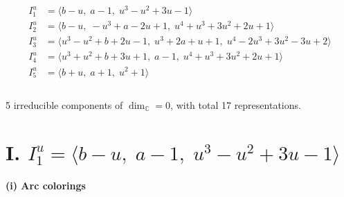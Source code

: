 \documentclass[1p]{elsarticle_modified}
\theoremstyle{definition}
\begin{document}
\begin{align*}
I^u_{1}&=\langle 
b- u,\;a-1,\;u^3- u^2+3 u-1\rangle \\
I^u_{2}&=\langle 
b- u,\;- u^3+a-2 u+1,\;u^4+u^3+3 u^2+2 u+1\rangle \\
I^u_{3}&=\langle 
u^3- u^2+b+2 u-1,\;u^3+2 a+u+1,\;u^4-2 u^3+3 u^2-3 u+2\rangle \\
I^u_{4}&=\langle 
u^3+u^2+b+3 u+1,\;a-1,\;u^4+u^3+3 u^2+2 u+1\rangle \\
I^u_{5}&=\langle 
b+u,\;a+1,\;u^2+1\rangle \\
\\
\end{align*}
\raggedright * 5 irreducible components of $\dim_{\mathbb{C}}=0$, with total 17 representations.\\
\newpage
\renewcommand{\arraystretch}{1}
\centering \section*{I. $I^u_{1}= \langle b- u,\;a-1,\;u^3- u^2+3 u-1 \rangle$}
\flushleft \textbf{(i) Arc colorings}\\
\end{document}
